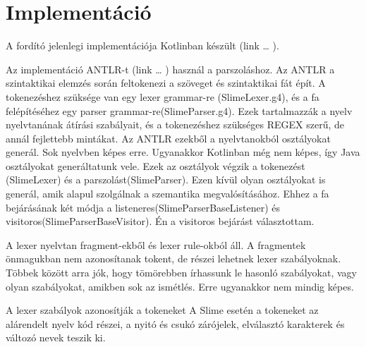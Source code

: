 \section{Implementáció}
A fordító jelenlegi implementációja Kotlinban készült (link … ).

Az implementáció ANTLR-t (link … ) használ a parszoláshoz. 
Az ANTLR a szintaktikai elemzés során feltokenezi a szöveget és szintaktikai fát épít. 
A tokenezéshez szüksége van egy lexer grammar-re (SlimeLexer.g4), és a fa felépítéséhez egy parser grammar-re(SlimeParser.g4). 
Ezek tartalmazzák a nyelv nyelvtanának átírási szabályait, és a tokenezéshez szükséges REGEX szerű, de annál fejlettebb mintákat. 
Az ANTLR ezekből a nyelvtanokból osztályokat generál. 
Sok nyelvben képes erre. 
Ugyanakkor Kotlinban még nem képes, így Java osztályokat generáltatunk vele. 
Ezek az osztályok végzik a tokenezést (SlimeLexer) és a parszolást(SlimeParser). 
Ezen kívül olyan osztályokat is generál, amik alapul szolgálnak a  szemantika megvalósításához. 
Ehhez a fa bejárásának két módja a listeneres(SlimeParserBaseListener) és visitoros(SlimeParserBaseVisitor).
Én a visitoros bejárást választottam.

A lexer nyelvtan fragment-ekből és lexer rule-okból áll. 
A fragmentek önmagukban nem azonosítanak tokent, de részei lehetnek lexer szabályoknak. 
Többek között arra jók, hogy tömörebben írhassunk le hasonló szabályokat, vagy olyan szabályokat, amikben sok az ismétlés. 
Erre ugyanakkor nem mindig képes.

A lexer szabályok azonosítják a tokeneket
A Slime esetén a tokeneket az alárendelt nyelv kód részei, a nyitó és csukó zárójelek, elválasztó karakterek és változó nevek teszik ki.

